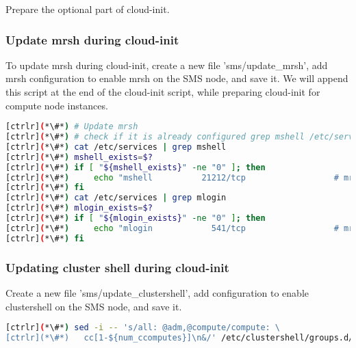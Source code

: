 Prepare the optional part of cloud-init.
\subsubsection{Update mrsh during cloud-init}

	To update mrsh during cloud-init, create a new file 'sms/update\_mrsh', add mrsh configuration to enable mrsh on the SMS node, and save it. We will append this script at the end of the cloud-init script, while preparing cloud-init for compute node instances.


\begin{lstlisting}[language=bash,keywords={}]
[ctrlr](*\#*) # Update mrsh
[ctrlr](*\#*) # check if it is already configured grep mshell /etc/services will return non-zero, else configure
[ctrlr](*\#*) cat /etc/services | grep mshell
[ctrlr](*\#*) mshell_exists=$?
[ctrlr](*\#*) if [ "${mshell_exists}" -ne "0" ]; then
[ctrlr](*\#*)     echo "mshell          21212/tcp                  # mrshd" >> /etc/services
[ctrlr](*\#*) fi
[ctrlr](*\#*) cat /etc/services | grep mlogin
[ctrlr](*\#*) mlogin_exists=$?
[ctrlr](*\#*) if [ "${mlogin_exists}" -ne "0" ]; then
[ctrlr](*\#*)     echo "mlogin            541/tcp                  # mrlogind" >> /etc/services
[ctrlr](*\#*) fi
\end{lstlisting} 


\subsubsection{Updating cluster shell during cloud-init}
	
	Create a new file 'sms/update\_clustershell', add configuration to enable clustershell on the SMS node, and save it. 


\begin{lstlisting}[language=bash,keywords={}]
[ctrlr](*\#*) sed -i -- 's/all: @adm,@compute/compute: \
[ctrlr](*\#*)   cc[1-${num_ccomputes}]\n&/' /etc/clustershell/groups.d/local.cfg
\end{lstlisting} 
 
